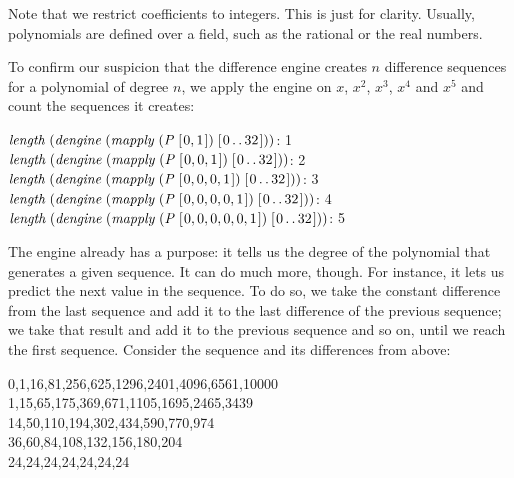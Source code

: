 \documentclass[tikz]{scrreprt}
\newcommand{\Conid}[1]{\mathit{#1}}
\newcommand{\Varid}[1]{\mathit{#1}}
\begin{document}
Note that we restrict coefficients to integers.
This is just for clarity.
Usually, polynomials are defined over a field,
such as the rational or the real numbers.

To confirm our suspicion that the difference engine
creates $n$ difference sequences for a polynomial of degree $n$,
we apply the engine on $x$, $x^2$, $x^3$, $x^4$ and $x^5$
and count the sequences it creates:

\begin{minipage}{\textwidth}
\ensuremath{\Varid{length}\;(\Varid{dengine}\;(\Varid{mapply}\;(\Conid{P}\;[\mskip1.5mu \mathrm{0},\mathrm{1}\mskip1.5mu])\;[\mskip1.5mu \mathrm{0}\mathinner{\ldotp\ldotp}\mathrm{32}\mskip1.5mu]))}: 1\\
\ensuremath{\Varid{length}\;(\Varid{dengine}\;(\Varid{mapply}\;(\Conid{P}\;[\mskip1.5mu \mathrm{0},\mathrm{0},\mathrm{1}\mskip1.5mu])\;[\mskip1.5mu \mathrm{0}\mathinner{\ldotp\ldotp}\mathrm{32}\mskip1.5mu]))}: 2\\
\ensuremath{\Varid{length}\;(\Varid{dengine}\;(\Varid{mapply}\;(\Conid{P}\;[\mskip1.5mu \mathrm{0},\mathrm{0},\mathrm{0},\mathrm{1}\mskip1.5mu])\;[\mskip1.5mu \mathrm{0}\mathinner{\ldotp\ldotp}\mathrm{32}\mskip1.5mu]))}: 3\\
\ensuremath{\Varid{length}\;(\Varid{dengine}\;(\Varid{mapply}\;(\Conid{P}\;[\mskip1.5mu \mathrm{0},\mathrm{0},\mathrm{0},\mathrm{0},\mathrm{1}\mskip1.5mu])\;[\mskip1.5mu \mathrm{0}\mathinner{\ldotp\ldotp}\mathrm{32}\mskip1.5mu]))}: 4\\
\ensuremath{\Varid{length}\;(\Varid{dengine}\;(\Varid{mapply}\;(\Conid{P}\;[\mskip1.5mu \mathrm{0},\mathrm{0},\mathrm{0},\mathrm{0},\mathrm{0},\mathrm{1}\mskip1.5mu])\;[\mskip1.5mu \mathrm{0}\mathinner{\ldotp\ldotp}\mathrm{32}\mskip1.5mu]))}: 5
\end{minipage}

The engine already has a purpose:
it tells us the degree of the polynomial
that generates a given sequence.
It can do much more, though.
For instance, it lets us predict the next value
in the sequence.
To do so, we take the constant difference 
from the last sequence and add it to 
the last difference of the previous sequence;
we take that result and add it to the previous sequence
and so on, until we reach the first sequence.
Consider the sequence and its differences from above:

\begin{minipage}{\textwidth}
0,1,16,81,256,625,1296,2401,4096,6561,10000\\
1,15,65,175,369,671,1105,1695,2465,3439\\
14,50,110,194,302,434,590,770,974\\
36,60,84,108,132,156,180,204\\
24,24,24,24,24,24,24
\end{minipage}
\end{document}
